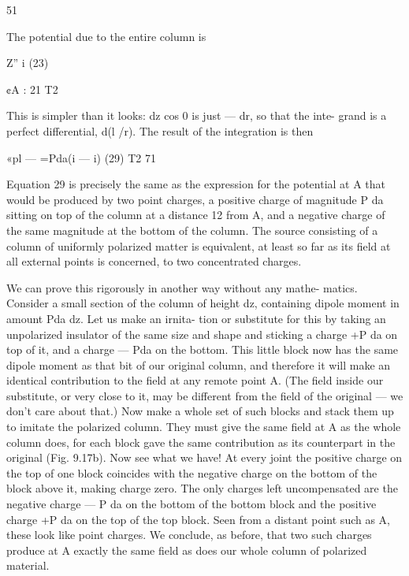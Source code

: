\begin{equation}
\end{equation}
51%

The potential due to the entire column is

\begin{equation}
\end{equation}
Z'' i (23)

¢A :  21 T2

This is simpler than it looks: dz cos 0 is just  --- dr, so that the inte-
grand is a perfect differential, d(l /r). The result of the integration is
then

\begin{equation}
\end{equation}
«pl --- =Pda(i --- i) (29)
T2 71

Equation 29 is precisely the same as the expression for the potential
at A that would be produced by two point charges, a positive
charge of magnitude P da sitting on top of the column at a distance 12
from A, and a negative charge of the same magnitude at the bottom
of the column. The source consisting of a column of uniformly
polarized matter is equivalent, at least so far as its field at all external
points is concerned, to two concentrated charges.

 

 

We can prove this rigorously in another way without any mathe-
matics. Consider a small section of the column of height dz, containing
dipole moment in amount Pda dz. Let us make an irnita-
tion or substitute for this by taking an unpolarized insulator of the
same size and shape and sticking a charge +P da on top of it, and a
charge  --- Pda on the bottom. This little block now has the same
dipole moment as that bit of our original column, and therefore it
will make an identical contribution to the field at any remote point A.
(The field inside our substitute, or very close to it, may be different
from the field of the original --- we don't care about that.) Now make
a whole set of such blocks and stack them up to imitate the polarized
column. They must give the same field at A as the whole column
does, for each block gave the same contribution as its counterpart
in the original (Fig. 9.17b). Now see what we have! At every joint
the positive charge on the top of one block coincides with the negative
charge on the bottom of the block above it, making charge zero.
The only charges left uncompensated are the negative charge  --- P da
on the bottom of the bottom block and the positive charge +P da on
the top of the top block. Seen from a distant point such as A, these
look like point charges. We conclude, as before, that two such
charges produce at A exactly the same field as does our whole column
of polarized material.

